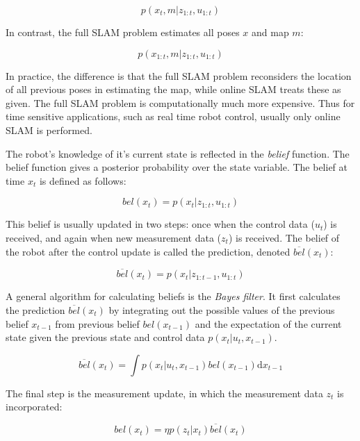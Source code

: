 \begin{equation}
p(x_{t}, m | z_{1:t}, u_{1:t})
\end{equation}

In contrast, the full SLAM problem estimates all poses $x$ and map $m$:

\begin{equation}
p(x_{1:t}, m | z_{1:t}, u_{1:t})
\end{equation}

In practice, the difference is that the full SLAM problem reconsiders the location of all previous poses in estimating the map, while online SLAM treats these as given. The full SLAM problem is computationally much more expensive. Thus for time sensitive applications, such as real time robot control, usually only online SLAM is performed.

The robot's knowledge of it's current state is reflected in the \emph{belief} function. The belief function gives a posterior probability over the state variable. The belief at time $x_t$ is defined as follows:

\begin{equation}
bel(x_t) = p(x_t | z_{1:t}, u_{1:t})
\end{equation}

This belief is usually updated in two steps: once when the control data ($u_t$) is received, and again when new measurement data ($z_t$) is received. The belief of the robot after the control update is called the prediction, denoted $\overline{bel}(x_t)$:

\begin{equation}
\overline{bel}(x_t) = p(x_t | z_{1:t-1}, u_{1:t})
\end{equation}

A general algorithm for calculating beliefs is the \emph{Bayes filter}. It first calculates the prediction $\overline{bel}(x_t)$ by integrating out the possible values of the previous belief $x_{t-1}$ from previous belief $bel(x_{t-1})$ and the expectation of the current state given the previous state and control data $p(x_t|u_t, x_{t-1})$.

\begin{equation}
\overline{bel}(x_t) = \int p(x_t|u_t, x_{t-1})bel(x_{t-1})\mathrm{d}x_{t-1}
\end{equation}

The final step is the measurement update, in which the measurement data $z_t$ is incorporated:

\begin{equation}
bel(x_t) = \eta p(z_t|x_t)\overline{bel}(x_t)
\end{equation}

